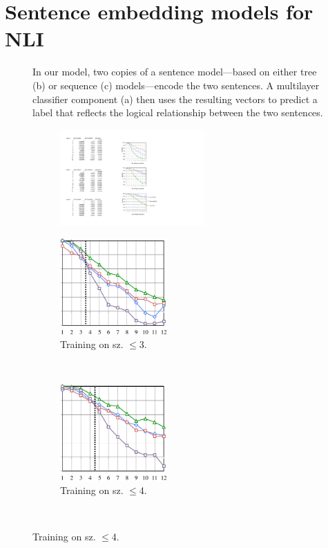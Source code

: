 \section{Sentence embedding models for NLI} \label{methods}

\begin{figure}[t]
  \centering
  
  \caption{In our model, two copies of a sentence model---based on either tree (b) or sequence (c) models---encode the two sentences. A multilayer classifier component (a) then uses the resulting vectors to predict a label that reflects the logical relationship between the two sentences.}
  \label{sample-figure}
\end{figure}

\begin{figure}[t]
  \centering
  \begin{subfigure}[t]{0.04\textwidth}
      \includegraphics[height=1.45in]{scale.pdf}
\end{subfigure}
\begin{subfigure}[t]{0.24\textwidth}
  \includegraphics[height=1.45in]{fig3c.pdf}
  \caption{Training on sz. $\le$3.}
  \end{subfigure}~~~
\begin{subfigure}[t]{0.24\textwidth}
    \includegraphics[height=1.45in]{fig4c.pdf}
  \caption{Training on sz. $\le$4.}
  \end{subfigure}~~~~

\end{figure}
